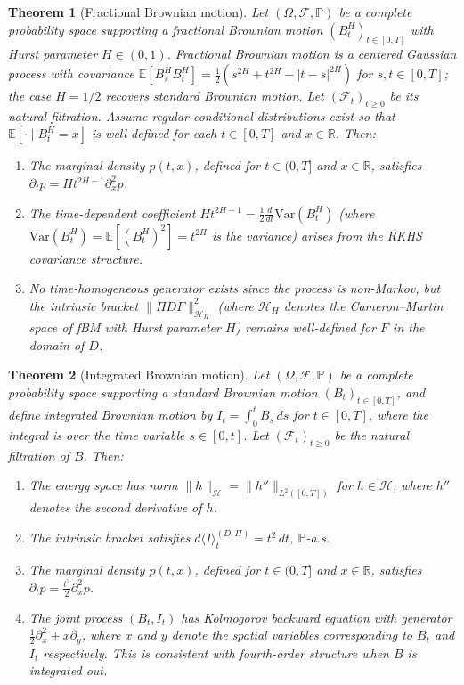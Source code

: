 \documentclass[12pt]{article}
\theoremstyle{plain}
\newtheorem{theorem}{Theorem}[section]
\theoremstyle{definition}
\theoremstyle{remark}
\newcommand{\E}{\mathbb{E}}
\newcommand{\R}{\mathbb{R}}
\newcommand{\F}{\mathcal{F}}
\newcommand{\PP}{\mathbb{P}}
\newcommand{\HH}{\mathcal{H}}
\begin{document}
\begin{theorem}[Fractional Brownian motion]\label{thm:fBM}
Let $(\Omega, \F, \PP)$ be a complete probability space supporting a fractional Brownian motion $(B_t^H)_{t \in [0,T]}$ with Hurst parameter $H \in (0,1)$. Fractional Brownian motion is a centered Gaussian process with covariance $\E[B_s^H B_t^H] = \frac{1}{2}(s^{2H} + t^{2H} - |t-s|^{2H})$ for $s, t \in [0,T]$; the case $H = 1/2$ recovers standard Brownian motion. Let $(\F_t)_{t \geq 0}$ be its natural filtration. Assume regular conditional distributions exist so that $\E[\cdot \mid B_t^H = x]$ is well-defined for each $t \in [0,T]$ and $x \in \R$. Then:
\begin{enumerate}[label=(\alph*)]
\item The marginal density $p(t,x)$, defined for $t \in (0,T]$ and $x \in \R$, satisfies $\partial_t p = Ht^{2H-1} \partial_x^2 p$.
\item The time-dependent coefficient $Ht^{2H-1} = \frac{1}{2}\frac{d}{dt}\mathrm{Var}(B_t^H)$ (where $\mathrm{Var}(B_t^H) = \E[(B_t^H)^2] = t^{2H}$ is the variance) arises from the RKHS covariance structure.
\item No time-homogeneous generator exists since the process is non-Markov, but the intrinsic bracket $\|\Pi DF\|_{\HH_H}^2$ (where $\HH_H$ denotes the Cameron--Martin space of fBM with Hurst parameter $H$) remains well-defined for $F$ in the domain of $D$.
\end{enumerate}
\end{theorem}

\begin{theorem}[Integrated Brownian motion]\label{thm:IBM}
Let $(\Omega, \F, \PP)$ be a complete probability space supporting a standard Brownian motion $(B_t)_{t \in [0,T]}$, and define integrated Brownian motion by $I_t = \int_0^t B_s \, ds$ for $t \in [0,T]$, where the integral is over the time variable $s \in [0,t]$. Let $(\F_t)_{t \geq 0}$ be the natural filtration of $B$. Then:
\begin{enumerate}[label=(\alph*)]
\item The energy space has norm $\|h\|_{\HH} = \|h''\|_{L^2([0,T])}$ for $h \in \HH$, where $h''$ denotes the second derivative of $h$.
\item The intrinsic bracket satisfies $d\langle I \rangle_t^{(D,\Pi)} = t^2 \, dt$, $\PP$-a.s.
\item The marginal density $p(t,x)$, defined for $t \in (0,T]$ and $x \in \R$, satisfies $\partial_t p = \frac{t^2}{2}\partial_x^2 p$.
\item The joint process $(B_t, I_t)$ has Kolmogorov backward equation with generator $\frac{1}{2}\partial_x^2 + x\partial_y$, where $x$ and $y$ denote the spatial variables corresponding to $B_t$ and $I_t$ respectively. This is consistent with fourth-order structure when $B$ is integrated out.
\end{enumerate}
\end{theorem}
\end{document}
